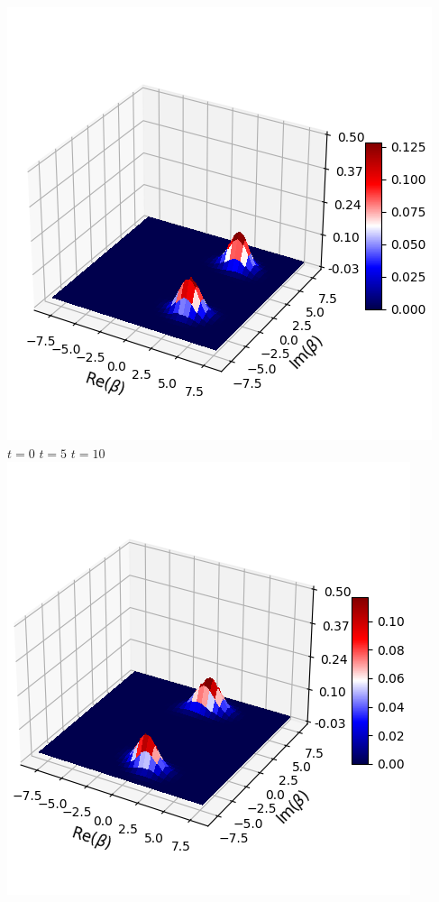 \documentclass[11pt, oneside]{book}
\theoremstyle{break}
\theoremstyle{break}
\begin{document}
\begin{center}
\includegraphics[scale=0.4]{542HW6/Q(10)}\\
$t=0$ \qquad\qquad\qquad\qquad\qquad $t=5$ \qquad\qquad\qquad\qquad\qquad $t=10$\\
\includegraphics[scale=0.4]{542HW6/Q(15)}

\end{center}
\end{document}
